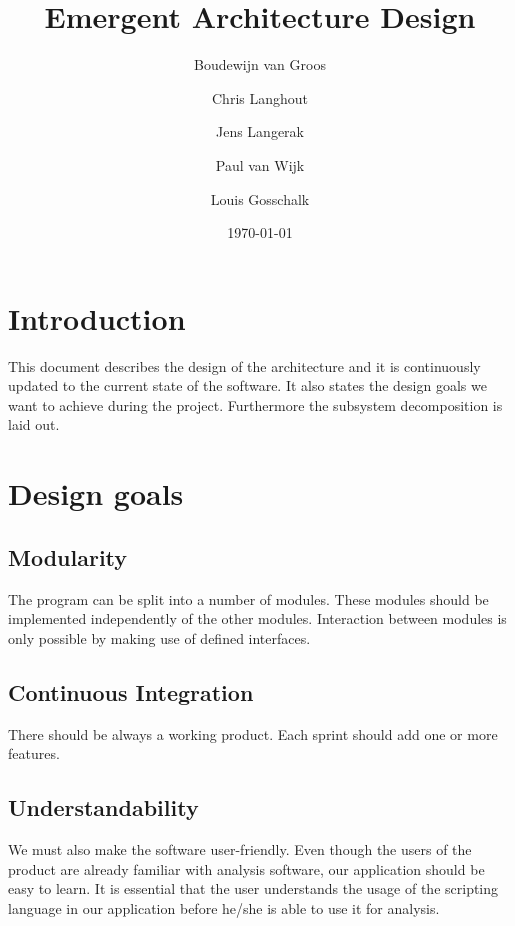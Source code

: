 \documentclass[a4paper]{article}
\title{Emergent Architecture Design}
\author[1]{Boudewijn van Groos}
\author[2]{Chris Langhout}
\author[3]{Jens Langerak}
\author[4]{Paul van Wijk}
\author[5]{Louis Gosschalk}
\affil[1]{bvangroos \\
4229843}
\affil[2]{clanghout \\
4281705}
\affil[3]{jlangerak \\
4317327}
\affil[4]{pjvanwijk \\
4285034}
\affil[5]{lgosschalk \\
4214528}
\date{\today}
\begin{document}
\maketitle
\tableofcontents
\newpage

\section{Introduction}
This document describes the design of the architecture and it is continuously updated to the current state of the software. It also states the design goals we want to achieve during the project. Furthermore the subsystem decomposition is laid out.

\section{Design goals}
\subsection{Modularity}
The program can be split into a number of modules. These modules should be implemented independently of the other modules. Interaction between modules is only possible by making use of defined interfaces.

\subsection{Continuous Integration}
There should be always a working product. Each sprint should add one or more features.

\subsection{Understandability}
We must also make the software user-friendly. Even though the users of the
product are already familiar with analysis software, our application should be
easy to learn. It is essential that the user understands the usage of the
scripting language in our application before he/she is able to use it for
analysis.
\end{document}
